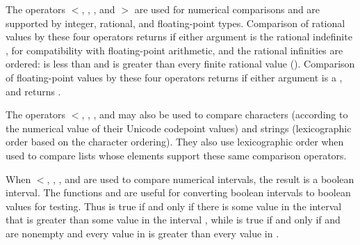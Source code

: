 The operators $<$, \EXP{\leq}, \EXP{\geq}, and $>$ are
  used for numerical comparisons
and are supported by integer, rational, and floating-point types.
Comparison of rational values by these four operators returns 
if either argument is the rational indefinite , for compatibility
with floating-point arithmetic, and the rational infinities are ordered:
 is less than and  is greater than every finite rational
value ().
Comparison of floating-point values by these four operators returns
 if either argument is a , and  returns
.

The operators $<$, \EXP{\leq}, \EXP{\geq}, and \EXP{>} may also be
used to compare characters
(according to the numerical value of their Unicode codepoint values)
and strings (lexicographic order based on the character ordering).
They also use lexicographic order when used to compare lists
whose elements support these same comparison operators.

When $<$, \EXP{\leq}, \EXP{\geq}, and \EXP{>} are used to compare numerical
intervals, the result is a boolean interval.  The functions
 and  are useful for converting
boolean intervals to boolean values for testing.  Thus
 is true if and only if there is some value in the interval
 that is greater than some value in the interval , while
 is true if and only if  and  are nonempty
and every value in  is greater than every value in .

